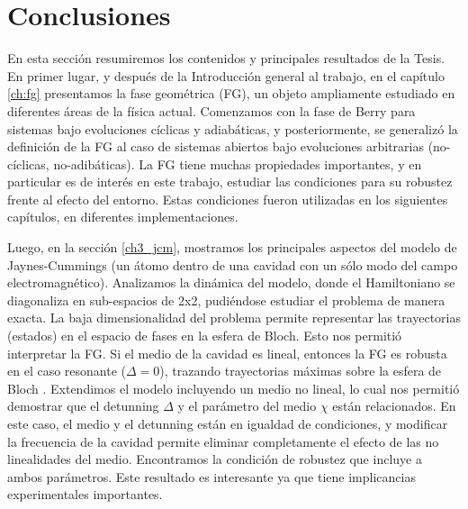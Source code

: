 \chapter{Conclusiones}
\label{ch6:conclusiones}


\pagestyle{fancy}
\fancyhf{}
\fancyhead[LE]{\nouppercase{\rightmark\hfill}}
\fancyhead[RO]{\nouppercase{\leftmark\hfill}}
\fancyfoot[LE,RO]{\hfill\thepage\hfill}

En esta sección resumiremos los contenidos y principales resultados de la Tesis. En primer lugar, y después de la Introducción general al trabajo, 
en el capítulo \ref{ch:fg}  presentamos la fase geométrica (FG), un objeto ampliamente estudiado en diferentes áreas de la física actual. Comenzamos con la fase de Berry para sistemas bajo evoluciones cíclicas y adiabáticas, y posteriormente, se generalizó la definición de la FG al caso de sistemas abiertos bajo evoluciones arbitrarias (no-cíclicas, no-adibáticas). La FG tiene muchas propiedades importantes, y en particular es de interés en este trabajo, estudiar las condiciones para su robustez frente al efecto del entorno. Estas condiciones fueron utilizadas en los siguientes capítulos, en diferentes implementaciones.

Luego, en la sección \ref{ch3_jcm}, mostramos los principales aspectos del modelo de Jaynes-Cummings (un átomo dentro de una cavidad con un sólo modo del campo electromagnético). Analizamos la dinámica del modelo, donde el Hamiltoniano se diagonaliza en sub-espacios de 2x2, pudiéndose estudiar el problema de manera exacta. La baja dimensionalidad del problema permite representar las trayectorias (estados) en el espacio de fases en la esfera de Bloch. Esto nos permitió interpretar la FG. Si el medio de la cavidad es lineal, entonces la FG es robusta en el caso resonante ($\Delta=0$), trazando trayectorias máximas sobre la esfera de Bloch \cite{Viotti2022}. Extendimos el modelo incluyendo un medio no lineal, lo cual nos permitió demostrar que el detunning $\Delta$ y el parámetro del medio $\chi$ están relacionados. En este caso, el medio y el detunning están en igualdad de condiciones, y modificar la frecuencia de la cavidad permite eliminar completamente el efecto de las no linealidades del medio. Encontramos la condición de robustez que incluye a ambos parámetros. Este resultado es interesante ya que tiene implicancias experimentales importantes.

